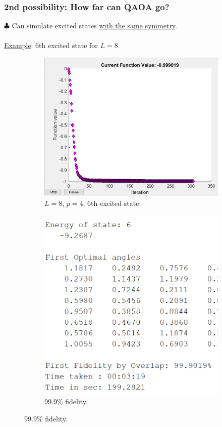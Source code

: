 \documentclass{beamer}
\theoremstyle{definition}
\begin{document}
\begin{frame}
\frametitle{2nd possibility: How far can QAOA go?}

$\clubsuit$ Can simulate excited states \underline{with the same symmetry}.\\

$\,$\\


\underline{Example}: $6$th excited state for $L=8$ 
\begin{figure}[!htb]
	\centering
	\begin{subfigure}{0.5 \textwidth}
		\centering
		\includegraphics[scale=0.45]{N8p4_6th}
		\caption{$L=8$, $p=4$, 6th excited state}
	\end{subfigure}%
	\begin{subfigure}{0.5 \textwidth}
		\centering
		\includegraphics[scale=0.52]{N8p4_6th_out}
		\caption{99.9\% fidelity.}
	\end{subfigure}
\end{figure}


\end{frame}
\end{document}
